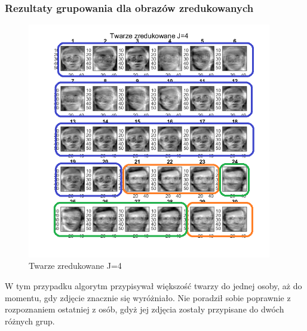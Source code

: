 \documentclass[11pt, a4paper]{article}
\newcommand{\fbi}{\leavevmode{\parindent=1em\indent}}
\begin{document}
\subsubsection{Rezultaty grupowania dla obrazów zredukowanych}


\begin{figure}[H]
	\centering
	\includegraphics[width=0.95\textwidth]{./assets/ilustracja_zad2_redukcja_j4.png}
	\caption{Twarze zredukowane J=4}
	\label{fig:ilustracja_zad2_redukcja_j4}
\end{figure}

\fbi
W tym przypadku algorytm przypisywał większość twarzy do jednej osoby, aż do momentu, gdy zdjęcie znacznie się wyróżniało. Nie poradził sobie poprawnie z rozpoznaniem ostatniej z osób, gdyż jej zdjęcia zostały przypisane do dwóch różnych grup.
\end{document}
